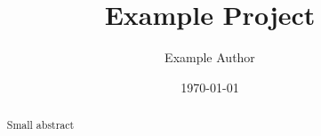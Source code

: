 \documentclass[12pt]{article}
\title{Example Project}
\author{Example Author}
\date{\today} %
\begin{document}
\maketitle

\begin{abstract}
    Small abstract
\end{abstract}

\newpage






\end{document}
